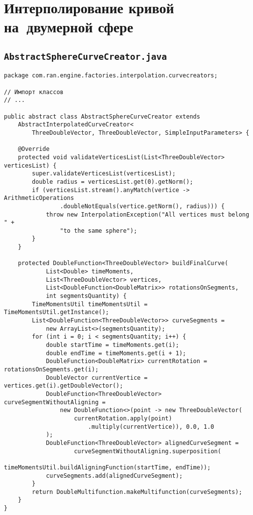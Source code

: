 \chapter{Интерполирование кривой на~двумерной сфере}

\section*{\texttt{AbstractSphereCurveCreator.java}}
\begin{verbatim}
package com.ran.engine.factories.interpolation.curvecreators;

// Импорт классов
// ...

public abstract class AbstractSphereCurveCreator extends
    AbstractInterpolatedCurveCreator<
        ThreeDoubleVector, ThreeDoubleVector, SimpleInputParameters> {

    @Override
    protected void validateVerticesList(List<ThreeDoubleVector> verticesList) {
        super.validateVerticesList(verticesList);
        double radius = verticesList.get(0).getNorm();
        if (verticesList.stream().anyMatch(vertice -> ArithmeticOperations
                .doubleNotEquals(vertice.getNorm(), radius))) {
            throw new InterpolationException("All vertices must belong " +
                "to the same sphere");
        }
    }

    protected DoubleFunction<ThreeDoubleVector> buildFinalCurve(
            List<Double> timeMoments,
            List<ThreeDoubleVector> vertices,
            List<DoubleFunction<DoubleMatrix>> rotationsOnSegments,
            int segmentsQuantity) {
        TimeMomentsUtil timeMomentsUtil = TimeMomentsUtil.getInstance();
        List<DoubleFunction<ThreeDoubleVector>> curveSegments =
            new ArrayList<>(segmentsQuantity);
        for (int i = 0; i < segmentsQuantity; i++) {
            double startTime = timeMoments.get(i);
            double endTime = timeMoments.get(i + 1);
            DoubleFunction<DoubleMatrix> currentRotation = rotationsOnSegments.get(i);
            DoubleVector currentVertice = vertices.get(i).getDoubleVector();
            DoubleFunction<ThreeDoubleVector> curveSegmentWithoutAligning =
                new DoubleFunction<>(point -> new ThreeDoubleVector(
                    currentRotation.apply(point)
                        .multiply(currentVertice)), 0.0, 1.0
            );
            DoubleFunction<ThreeDoubleVector> alignedCurveSegment =
                    curveSegmentWithoutAligning.superposition(
                        timeMomentsUtil.buildAligningFunction(startTime, endTime));
            curveSegments.add(alignedCurveSegment);
        }
        return DoubleMultifunction.makeMultifunction(curveSegments);
    }
}
\end{verbatim}

